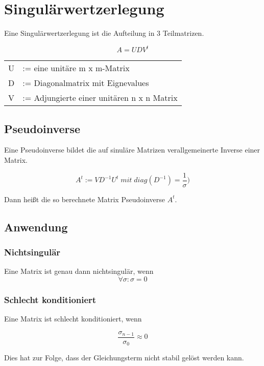 \chapter{Singulärwertzerlegung}
\label{chp:singulaerwertzerlegung}
 Eine Singulärwertzerlegung ist die Aufteilung in 3 Teilmatrizen. 
 
 \begin{equation}
 	A = UDV^t
 \end{equation}
 
 \begin{tabular}{cl}
 	U & := eine unitäre  m x m-Matrix \\
 	D & := Diagonalmatrix mit Eignevalues \\
 	V & := Adjungierte einer unitären n x n Matrix
 \end{tabular}

\section{Pseudoinverse}

Eine Pseudoinverse bildet die auf sinuläre Matrizen verallgemeinerte Inverse einer Matrix.

\begin{equation}
A^t := VD^{-1}U^t \; mit \; diag(D^{-1}) = \frac{1}{\sigma})
\end{equation}

Dann heißt die so berechnete Matrix Pseudoinverse $A^t$. 

\section{Anwendung}

\subsection{Nichtsingulär}

Eine Matrix ist genau dann nichtsingulär, wenn 
\begin{equation}
\forall \sigma: \sigma = 0
\end{equation}


\subsection{Schlecht konditioniert}
Eine Matrix ist schlecht konditioniert, wenn

\begin{equation}
\frac{\sigma_{n-1}}{\sigma_0} \approx 0
\end{equation}

Dies hat zur Folge, dass der Gleichungsterm nicht stabil gelöst werden kann.
 
